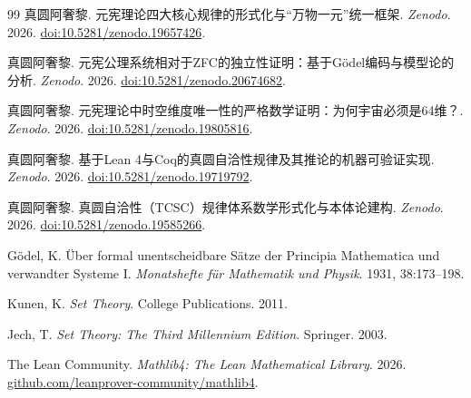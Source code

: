 \documentclass[12pt,a4paper]{article}
\theoremstyle{plain}
\theoremstyle{definition}
\begin{document}
 
\begin{thebibliography}{99}
 真圆阿奢黎. 元宪理论四大核心规律的形式化与“万物一元”统一框架. \textit{Zenodo}. 2026. \href{https://doi.org/10.5281/zenodo.19657426}{doi:10.5281/zenodo.19657426}.
 
 真圆阿奢黎. 元宪公理系统相对于ZFC的独立性证明：基于Gödel编码与模型论的分析. \textit{Zenodo}. 2026. \href{https://doi.org/10.5281/zenodo.20674682}{doi:10.5281/zenodo.20674682}.
 
 真圆阿奢黎. 元宪理论中时空维度唯一性的严格数学证明：为何宇宙必须是64维？. \textit{Zenodo}. 2026. \href{https://doi.org/10.5281/zenodo.19805816}{doi:10.5281/zenodo.19805816}.
 
 真圆阿奢黎. 基于Lean 4与Coq的真圆自洽性规律及其推论的机器可验证实现. \textit{Zenodo}. 2026. \href{https://doi.org/10.5281/zenodo.19719792}{doi:10.5281/zenodo.19719792}.
 
 真圆阿奢黎. 真圆自洽性（TCSC）规律体系数学形式化与本体论建构. \textit{Zenodo}. 2026. \href{https://doi.org/10.5281/zenodo.19585266}{doi:10.5281/zenodo.19585266}.
 
 Gödel, K. Über formal unentscheidbare Sätze der Principia Mathematica und verwandter Systeme I. \textit{Monatshefte für Mathematik und Physik}. 1931, 38:173--198.
 
 Kunen, K. \textit{Set Theory}. College Publications. 2011.
 
 Jech, T. \textit{Set Theory: The Third Millennium Edition}. Springer. 2003.
 
 The Lean Community. \textit{Mathlib4: The Lean Mathematical Library}. 2026. \href{https://github.com/leanprover-community/mathlib4}{github.com/leanprover-community/mathlib4}.
 
\end{thebibliography}
 
\appendix
\end{document}
